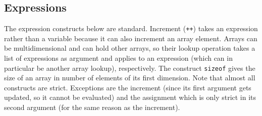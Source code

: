 \documentclass{article}
\begin{document}
\begin{kdefinition}
\begin{module}{}
\begin{kblock}[text]
 \subsection{Expressions}
The expression constructs below are standard.  Increment (\texttt{++}) takes
an expression rather than a variable because it can also increment an array
element.  Arrays can be multidimensional and can hold other arrays, so their
lookup operation takes a list of expressions as argument and applies to an
expression (which can in particular be another array lookup), respectively.
The construct \texttt{sizeof} gives the size of an array in number of elements
of its first dimension.  Note that almost all constructs are strict.
Exceptions are the increment (since its first argument gets updated, so it
cannot be evaluated) and the assignment which is only strict in its second
argument (for the same reason as the increment). \end{kblock}

\begin{syntaxBlock}{}
\end{syntaxBlock}
\begin{kblock}[text]

\end{kblock}
\end{module}
\end{kdefinition}
\end{document}
